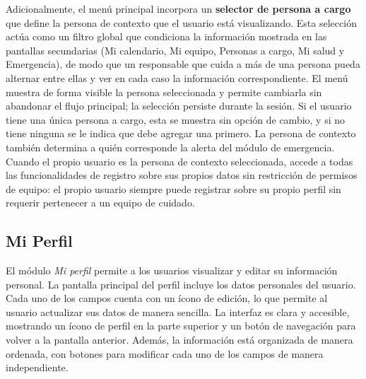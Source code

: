 \documentclass[a4paper,12pt]{article}
\begin{document}
    \par Adicionalmente, el menú principal incorpora un \textbf{selector de persona a cargo} que define la persona de contexto que el usuario está visualizando. Esta selección actúa como un filtro global que condiciona la información mostrada en las pantallas secundarias (Mi calendario, Mi equipo, Personas a cargo, Mi salud y Emergencia), de modo que un responsable que cuida a más de una persona pueda alternar entre ellas y ver en cada caso la información correspondiente. El menú muestra de forma visible la persona seleccionada y permite cambiarla sin abandonar el flujo principal; la selección persiste durante la sesión. Si el usuario tiene una única persona a cargo, esta se muestra sin opción de cambio, y si no tiene ninguna se le indica que debe agregar una primero. La persona de contexto también determina a quién corresponde la alerta del módulo de emergencia. Cuando el propio usuario es la persona de contexto seleccionada, accede a todas las funcionalidades de registro sobre sus propios datos sin restricción de permisos de equipo: el propio usuario siempre puede registrar sobre su propio perfil sin requerir pertenecer a un equipo de cuidado.
    \subsection{Mi Perfil}
    \par El módulo \textit{Mi perfil} permite a los usuarios visualizar y editar su información personal. La pantalla principal del perfil incluye los datos personales del usuario. Cada uno de los campos cuenta con un ícono de edición, lo que permite al usuario actualizar sus datos de manera sencilla. La interfaz es clara y accesible, mostrando un ícono de perfil en la parte superior y un botón de navegación para volver a la pantalla anterior. Además, la información está organizada de manera ordenada, con botones para modificar cada uno de los campos de manera independiente.
\end{document}
